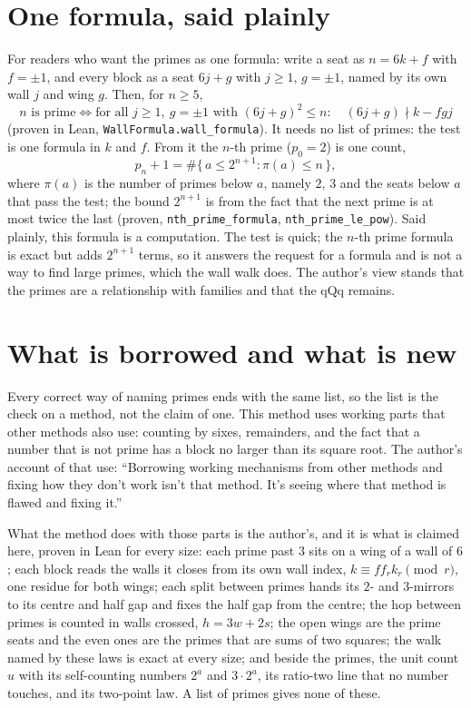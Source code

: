 \documentclass[11pt]{article}
\begin{document}
\section{One formula, said plainly}
For readers who want the primes as one formula: write a seat as $n = 6k+f$ with $f=\pm1$, and every block as a seat $6j+g$ with $j\ge1$, $g=\pm1$, named by its own wall $j$ and wing $g$. Then, for $n\ge5$,
\[ n \text{ is prime} \iff \text{for all } j\ge1,\ g=\pm1 \text{ with } (6j+g)^2\le n:\quad (6j+g)\nmid k - f g j \]
(proven in Lean, \texttt{WallFormula.wall\_formula}). It needs no list of primes: the test is one formula in $k$ and $f$. From it the $n$-th prime ($p_0 = 2$) is one count,
\[ p_n + 1 = \#\{\, a \le 2^{n+1} : \pi(a) \le n \,\}, \]
where $\pi(a)$ is the number of primes below $a$, namely $2$, $3$ and the seats below $a$ that pass the test; the bound $2^{n+1}$ is from the fact that the next prime is at most twice the last (proven, \texttt{nth\_prime\_formula}, \texttt{nth\_prime\_le\_pow}). Said plainly, this formula is a computation. The test is quick; the $n$-th prime formula is exact but adds $2^{n+1}$ terms, so it answers the request for a formula and is not a way to find large primes, which the wall walk does. The author's view stands that the primes are a relationship with families and that the qQq remains.

\section{What is borrowed and what is new}
Every correct way of naming primes ends with the same list, so the list is the check on a method, not the claim of one. This method uses working parts that other methods also use: counting by sixes, remainders, and the fact that a number that is not prime has a block no larger than its square root. The author's account of that use: ``Borrowing working mechanisms from other methods and fixing how they don't work isn't that method. It's seeing where that method is flawed and fixing it.''

What the method does with those parts is the author's, and it is what is claimed here, proven in Lean for every size: each prime past $3$ sits on a wing of a wall of $6$; each block reads the walls it closes from its own wall index, $k\equiv f f_r k_r \pmod r$, one residue for both wings; each split between primes hands its $2$- and $3$-mirrors to its centre and half gap and fixes the half gap from the centre; the hop between primes is counted in walls crossed, $h = 3w+2s$; the open wings are the prime seats and the even ones are the primes that are sums of two squares; the walk named by these laws is exact at every size; and beside the primes, the unit count $u$ with its self-counting numbers $2^a$ and $3\cdot2^a$, its ratio-two line that no number touches, and its two-point law. A list of primes gives none of these.
\end{document}
